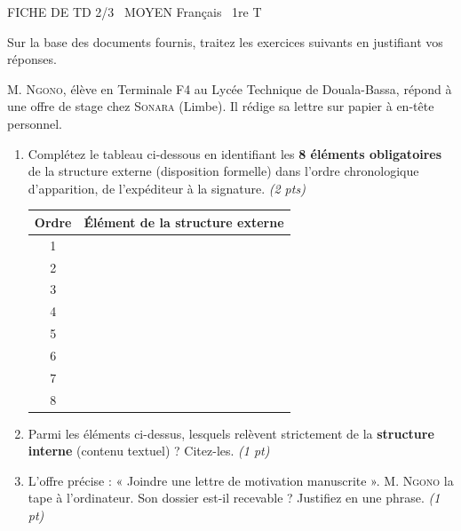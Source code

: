\documentclass[11pt]{article}
\begin{document}
\thispagestyle{empty}

\begin{tcolorbox}[enhanced,colback=popink,colframe=popink,arc=10pt,boxrule=0pt,left=12pt,right=12pt,top=9pt,bottom=9pt]
{\color{white}\popxbold\small FICHE DE TD 2/3 \textbullet\ MOYEN \hfill Français \textbullet\ 1re T\par}
\end{tcolorbox}
\vspace{4pt}

\noindent Sur la base des documents fournis, traitez les exercices suivants en justifiant vos réponses.

\begin{exercice}
M. \textsc{Ngono}, élève en Terminale F4 au Lycée Technique de Douala-Bassa, répond à une offre de stage chez \textsc{Sonara} (Limbe). Il rédige sa lettre sur papier à en-tête personnel.

\begin{enumerate}
    \item Complétez le tableau ci-dessous en identifiant les \textbf{8 éléments obligatoires} de la structure externe (disposition formelle) dans l'ordre chronologique d'apparition, de l'expéditeur à la signature. \textit{(2 pts)}
\begin{tabular}{|c|p{12cm}|}
    \hline
    \textbf{Ordre} & \textbf{Élément de la structure externe} \\ \hline
    1 & \\ \hline
    2 & \\ \hline
    3 & \\ \hline
    4 & \\ \hline
    5 & \\ \hline
    6 & \\ \hline
    7 & \\ \hline
    8 & \\ \hline
    \end{tabular}

    \item Parmi les éléments ci-dessus, lesquels relèvent strictement de la \textbf{structure interne} (contenu textuel) ? Citez-les. \textit{(1 pt)}

    \item L'offre précise : « Joindre une lettre de motivation manuscrite ». M. \textsc{Ngono} la tape à l'ordinateur. Son dossier est-il recevable ? Justifiez en une phrase. \textit{(1 pt)}
\end{enumerate}
\end{exercice}
\end{document}
